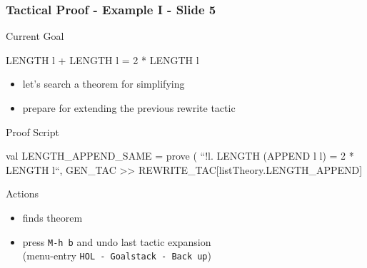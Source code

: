 \begin{frame}[fragile]
\frametitle{Tactical Proof - Example I - Slide 5}

\begin{block}{Current Goal}
\begin{semiverbatim}\small
LENGTH l + LENGTH l = 2 * LENGTH l
\end{semiverbatim}
\end{block}

\begin{itemize}
\item let's search a theorem for simplifying 
\item prepare for extending the previous rewrite tactic
\end{itemize}

\begin{block}{Proof Script}
\begin{semiverbatim}\small
val LENGTH_APPEND_SAME = prove (
  ``!l. LENGTH (APPEND l l) = 2 * LENGTH l``,
GEN_TAC >>
REWRITE_TAC[listTheory.LENGTH\_APPEND]
\end{semiverbatim}
\end{block}

\begin{block}{Actions}
\begin{itemize}
\item {} finds theorem 
\item press \texttt{M-h b} and undo last tactic expansion\\
      (menu-entry \texttt{HOL - Goalstack - Back up})
\end{itemize}
\end{block}
\end{frame}



